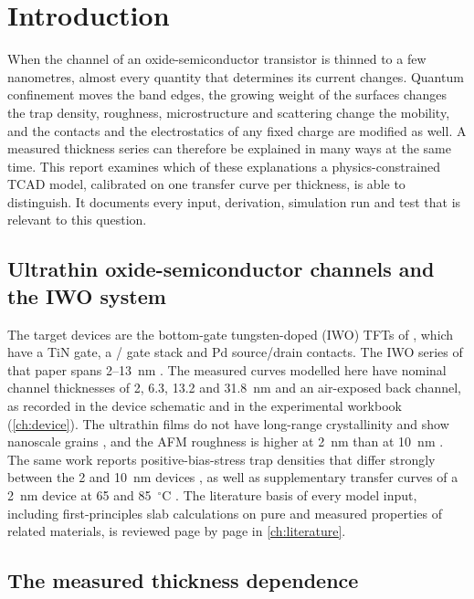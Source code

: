 \chapter{Introduction}\label{ch:intro}

When the channel of an oxide-semiconductor transistor is thinned to a few nanometres, almost every quantity that determines its current changes. Quantum confinement moves the band edges, the growing weight of the surfaces changes the trap density, roughness, microstructure and scattering change the mobility, and the contacts and the electrostatics of any fixed charge are modified as well. A measured thickness series can therefore be explained in many ways at the same time. This report examines which of these explanations a physics-constrained TCAD model, calibrated on one transfer curve per thickness, is able to distinguish. It documents every input, derivation, simulation run and test that is relevant to this question.

\section{Ultrathin oxide-semiconductor channels and the IWO system}\label{sec:intro-context}

The target devices are the bottom-gate tungsten-doped \InO{} (IWO) TFTs of \citet[pp.~2--3]{Januar2026}, which have a TiN gate, a \HfO/\AlO{} gate stack and Pd source/drain contacts. The IWO series of that paper spans 2--13~nm \citep[p.~2]{Januar2026}. The measured curves modelled here have nominal channel thicknesses of 2, 6.3, 13.2 and 31.8~nm and an air-exposed back channel, as recorded in the device schematic and in the experimental workbook (\cref{ch:device}). The ultrathin films do not have long-range crystallinity and show nanoscale grains \citep[p.~2]{Januar2026}, and the AFM roughness is higher at 2~nm than at 10~nm \citep[p.~8]{Januar2026}. The same work reports positive-bias-stress trap densities that differ strongly between the 2 and 10~nm devices \citep[p.~9]{Januar2026}, as well as supplementary transfer curves of a 2~nm device at 65 and 85~$^{\circ}$C \citep[SI Fig.~S12, caption on p.~11]{Januar2026}. The literature basis of every model input, including first-principles slab calculations on pure \InO{} and measured properties of related materials, is reviewed page by page in \cref{ch:literature}.

\section{The measured thickness dependence}\label{sec:intro-observation}

